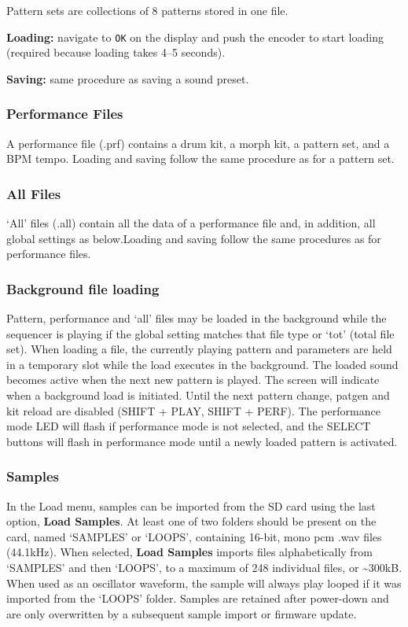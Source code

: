 Pattern sets are collections of 8 patterns stored in one file.

\textbf{Loading:} navigate to \texttt{OK} on the display and push the
encoder to start loading (required because loading takes 4--5 seconds).

\textbf{Saving:} same procedure as saving a sound preset.

\subsubsection{Performance Files}\label{performance-files}

A performance file (.prf) contains a drum kit, a morph kit, a pattern
set, and a BPM tempo. Loading and saving follow the same procedure as
for a pattern set.

\subsubsection{All Files}\label{all-files}

`All' files (.all) contain all the data of a performance file and, in
addition, all global settings as below.Loading and saving follow the
same procedures as for performance files.

\subsubsection{Background file loading}\label{background-file-loading}

Pattern, performance and `all' files may be loaded in the background
while the sequencer is playing if the global setting matches that file
type or `tot' (total file set). When loading a file, the currently
playing pattern and parameters are held in a temporary slot while the
load executes in the background. The loaded sound becomes active when
the next new pattern is played. The screen will indicate when a
background load is initiated. Until the next pattern change, patgen and
kit reload are disabled (SHIFT + PLAY, SHIFT + PERF). The performance
mode LED will flash if performance mode is not selected, and the SELECT
buttons will flash in performance mode until a newly loaded pattern is
activated.

\subsubsection{Samples}\label{samples}

In the Load menu, samples can be imported from the SD card using the
last option, \textbf{Load Samples}. At least one of two folders should
be present on the card, named `SAMPLES' or `LOOPS', containing 16-bit,
mono pcm .wav files (44.1kHz). When selected, \textbf{Load Samples}
imports files alphabetically from `SAMPLES' and then `LOOPS', to a
maximum of 248 individual files, or \textasciitilde300kB. When used as
an oscillator waveform, the sample will always play looped if it was
imported from the `LOOPS' folder. Samples are retained after power-down
and are only overwritten by a subsequent sample import or firmware
update.

